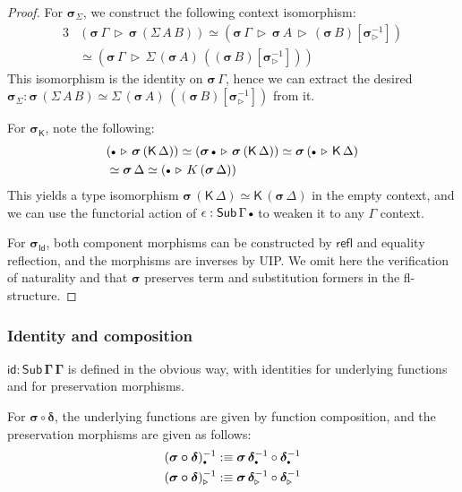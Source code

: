 \documentclass[12pt,a4paper,twoside,openany]{book}
\theoremstyle{remark}
\theoremstyle{definition}
\theoremstyle{theorem}
\newcommand{\bs}[1]{\boldsymbol{#1}}
\newcommand{\refl}{\mathsf{refl}}
\newcommand{\id}{\mathsf{id}}
\newcommand{\Sub}{\mathsf{Sub}}
\newcommand{\Id}{\mathsf{Id}}
\newcommand{\ext}{\triangleright}
\newcommand{\emptycon}{\scaleobj{.75}\bullet}
\newcommand{\K}{\mathsf{K}}
\newcommand{\bSub}{\bs{\Sub}}
\newcommand{\bGamma}{\bs{\Gamma}}
\newcommand{\bsigma}{\bs{\sigma}}
\newcommand{\bdelta}{\bs{\delta}}
\newcommand{\bid}{\bs{\id}}
\newcommand{\defn}{:\equiv}
\begin{document}
\begin{proof}
For $\bsigma_{\Sigma}$, we construct the following context isomorphism:
\begin{alignat*}{3}
& (\bsigma\,\Gamma\,\ext\,\bsigma\,(\Sigma\,A\,B)) \simeq
  (\bsigma\,\Gamma\,\ext\,\bsigma\,A\,\ext\,(\bsigma\,B)[\bsigma_{\ext}^{-1}]) \\
& \simeq (\bsigma\,\Gamma\,\ext\,\Sigma\,(\bsigma\,A)\,((\bsigma\,B)[\bsigma_{\ext}^{-1}]))
\end{alignat*}
This isomorphism is the identity on $\bsigma\,\Gamma$, hence we can extract the
desired $\bsigma_{\Sigma} : \bsigma\,(\Sigma\,A\,B) \simeq
\Sigma\,(\bsigma\,A)\,((\bsigma\,B)[\bsigma_{\ext}^{-1}])$ from it.

For $\bsigma_{\K}$, note the following:
\begin{alignat*}{3}
  & (\emptycon\,\ext\,\bsigma\,(\K\,\Delta)) \simeq
    (\bsigma\,\emptycon\,\ext\,\bsigma\,(\K\,\Delta)) \simeq
    \bsigma\,(\emptycon\,\ext\,\K\,\Delta)\\
  & \simeq \bsigma\,\Delta \simeq (\emptycon\,\ext\,K\,(\bsigma\,\Delta))
\end{alignat*}
This yields a type isomorphism $\bsigma\,(\K\,\Delta) \simeq
\K\,(\bsigma\,\Delta)$ in the empty context, and we can use the functorial action of
$\epsilon : \Sub\,\Gamma\,\emptycon$ to weaken it to any $\Gamma$ context.

For $\bsigma_{\Id}$, both component morphisms can be constructed by $\refl$ and
equality reflection, and the morphisms are inverses by UIP. We omit here the
verification of naturality and that $\bsigma$ preserves term and substitution
formers in the fl-structure.
\end{proof}

\subsubsection{Identity and composition}
\label{sec:idcomp}

$\bid : \bSub\,\bGamma\,\bGamma$ is defined in the obvious way, with identities for
underlying functions and for preservation morphisms.

For $\bs{\sigma \circ \delta}$, the underlying functions are given by
function composition, and the preservation morphisms are given as follows:
\begin{alignat*}{3}
  & (\bs{\sigma \circ \delta})_{\emptycon}^{-1} \defn
    \bsigma\,\bdelta_{\emptycon}^{-1} \circ \bdelta_{\emptycon}^{-1} \\
  & (\bs{\sigma \circ \delta})_{\ext}^{-1} \defn
    \bsigma\,\bdelta_{\ext}^{-1} \circ \bdelta_{\ext}^{-1}
\end{alignat*}
\end{document}
